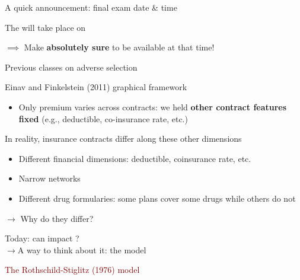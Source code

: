 \begin{frame}{A quick announcement: final exam date \& time}

    The  will take place on \\
    \vspace{10mm}

    $\implies$ Make \textbf{absolutely sure} to be available at that time!
\end{frame}
\begin{frame}{Previous classes on adverse selection}

    Einav and Finkelstein (2011) graphical framework
    \begin{itemize}
        \item Only premium varies across contracts:
        we held \textbf{other contract features fixed} (e.g., deductible, co-insurance rate, etc.)
    \end{itemize}
    \vspace{3mm}
    \pause

    In reality, insurance contracts differ along these other dimensions
    \begin{itemize}
        \item Different financial dimensions: deductible, coinsurance rate, etc.
        \item Narrow networks
        \item Different drug formularies: some plans cover some drugs while others do not
    \end{itemize}
    $\rightarrow$ Why do they differ?\\
    \vspace{3mm}
    \pause
     
    Today: can  impact ? \\
    \pause 
    $\rightarrow$A way to think about it: the  model
    
\end{frame}
\begin{frame}{}
    \begin{center}
    \Large \textcolor{maroon}{The Rothschild-Stiglitz (1976) model}
    \end{center}
\end{frame}
